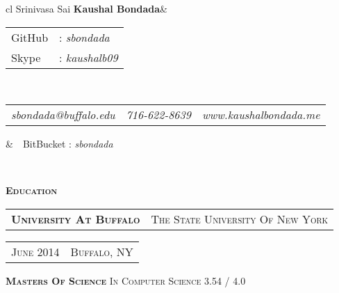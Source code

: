 \documentclass[10pt,letterpaper,oneside]{article}
\begin{document}
    \begin{center}
        \begin{tabular}{cl}
            {\Huge \textmd{Srinivasa Sai} \textbf{Kaushal Bondada}}&\begin{tabular}{ll}
                                                                        \textcolor{light-gray}{GitHub}&: \textit{sbondada}\\[0.1cm]
                                                                        \textcolor{light-gray}{Skype}&: \textit{kaushalb09}
                                                                    \end{tabular}\\[0.35cm]
            \begin{tabular}{c|c|c}
                \textit{sbondada@buffalo.edu}&\textit{716-622-8639}&\textit{www.kaushalbondada.me} 
            \end{tabular}                                          &\ \ \textcolor{light-gray}{BitBucket} : \textit{sbondada}
        \end{tabular}\\[0.5cm]
        \vspace{-10pt}
        \textcolor{light-gray}{\hrulefill} 
    \end{center} 
    \vspace{-4pt}
    \textcolor{light-gray}{\textbf{\large E\textsc{ducation}}}
    \vspace{3pt}\\
    \begin{tabular}{c|c}
        \textbf{\normalsize U\textsc{niversity} A\textsc{t} B\textsc{uffalo}}
        &{\small T\textsc{he} S\textsc{tate} U\textsc{niversity} O\textsc{f} N\textsc{ew} Y\textsc{ork}}
    \end{tabular}
    \hspace{2.58in}
    \begin{tabular}{c|c}
        \textcolor{light-gray}{{\small J\textsc{une} 2014}}
        &\textcolor{light-gray}{{\small B\textsc{uffalo}, NY}}\\
    \end{tabular}
    \begin{adjustwidth}{6pt}{0pt}
        {\small \textbf{M\textsc{asters} O\textsc{f} S\textsc{cience}} I\textsc{n} C\textsc{omputer} S\textsc{cience} }
        \hspace{4.7in}
        \textcolor{light-gray}{{\small 3.54 / 4.0}}
    \end{adjustwidth}
    \vspace{1pt}
\end{document}
